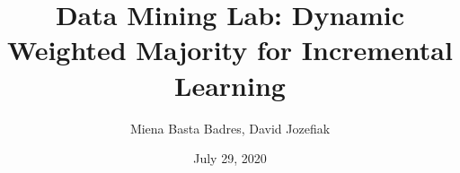 \documentclass[t]{beamer}
\title{Data Mining Lab: Dynamic Weighted Majority for Incremental Learning}
\date{July 29, 2020}
\author{Miena Basta Badres, David Jozefiak}
\begin{document}

\begin{frame}
\titlepage
\end{frame}











\end{document}

